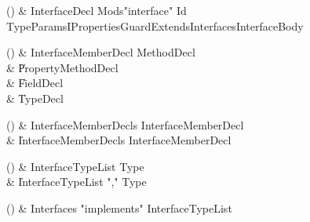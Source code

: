 \begin{bbgrammarappendix}

() & InterfaceDecl \label{prod:InterfaceDecl}  \: Mods\opt \xcd"interface" Id TypeParamsI\opt Properties\opt Guard\opt ExtendsInterfaces\opt InterfaceBody  \\


\end{bbgrammarappendix}

\begin{bbgrammarappendix}

() & InterfaceMemberDecl \label{prod:InterfaceMemberDecl}  \: MethodDecl  \\

 &    \| PropertyMethodDecl \\
 &    \| FieldDecl \\
 &    \| TypeDecl \\

\end{bbgrammarappendix}

\begin{bbgrammarappendix}

() & InterfaceMemberDecls \label{prod:InterfaceMemberDecls}  \: InterfaceMemberDecl  \\

 &    \| InterfaceMemberDecls InterfaceMemberDecl \\

\end{bbgrammarappendix}

\begin{bbgrammarappendix}

() & InterfaceTypeList \label{prod:InterfaceTypeList}  \: Type  \\

 &    \| InterfaceTypeList \xcd"," Type \\

\end{bbgrammarappendix}

\begin{bbgrammarappendix}

() & Interfaces \label{prod:Interfaces}  \: \xcd"implements" InterfaceTypeList  \\


\end{bbgrammarappendix}

